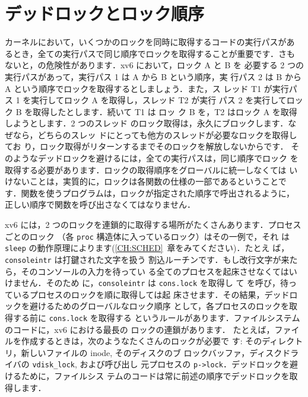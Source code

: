 \section{デッドロックとロック順序}
カーネルにおいて，いくつかのロックを同時に取得するコードの実行パスがあ
るとき，全ての実行パスで同じ順序でロックを取得することが重要です．さも
ないと，の危険性があります．xv6 において，ロック A と B を
必要する 2 つの実行パスがあって，実行パス 1 は A から B という順序，実
行パス 2 は B から A という順序でロックを取得するとしましょう．また，ス
レッド T1 が実行パス 1 を実行してロック A を取得し，スレッド T2 が実行
パス 2 を実行してロック B を取得したとします．続いて T1 は ロッ
ク B を，T2 はロック A を取得しようとします．2 つのスレッド
のロック取得は，永久にブロックします．なぜなら，どちらのスレッ
ドにとっても他方のスレッドが必要なロックを取得してお
り，ロック取得がリターンするまでそのロックを解放しないからです．
そのようなデッドロックを避けるには，全ての実行パスは，同じ順序でロック
を取得する必要があります．ロックの取得順序をグローバルに統一しなくては
いけないことは，実質的に，ロックは各関数の仕様の一部であるということで
す．関数を使うプログラムは，ロックが指定された順序で呼出されるように，
正しい順序で関数を呼び出さなくてはなりません．

xv6 には，2 つのロックを連鎖的に取得する場所がたくさんあります．プロセスごとのロック
（各 \lstinline{proc} 構造体に入っているロック）はその一例で，それ
は\lstinline{sleep} の動作原理によります(\ref{CH:SCHED}~章をみてください)．たとえ
ば，\lstinline{consoleintr}
は打鍵された文字を扱う
割込ルーチンです．もし改行文字が来たら，そのコンソールの入力を待ってい
る全てのプロセスを起床させなくてはいけません．そのため
に，\lstinline{consoleintr} は \lstinline{cons.lock} を取得し
て  を呼び，待っているプロセスのロックを順に取得しては起
床させます．その結果，デッドロックを避けるためのグローバルなロック順序
として，各プロセスのロックを取得する前に \lstinline{cons.lock} を取得する
というルールがあります．ファイルシステムのコードに，xv6 における最長の
ロックの連鎖があります．
たとえば，ファイルを作成するときは，次のようなたくさんのロックが必要で
す: そのディレクトリ，新しいファイルの inode, そのディスクのブ
ロックバッファ，ディスクドライバの \lstinline{vdisk_lock}, および呼び出し
元プロセスの \lstinline{p->lock}．デッドロックを避けるために，ファイルシス
テムのコードは常に前述の順序でデッドロックを取得します．

